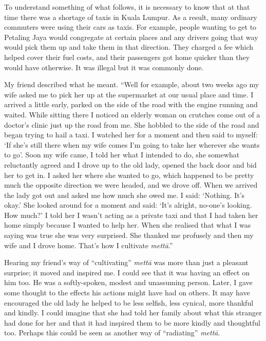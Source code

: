 \documentclass[10pt, openright]{book}
\begin{document}
To understand something of what follows, it is necessary to know that at that time there was a shortage of taxis in Kuala Lumpur. As a result, many ordinary commuters were using their cars as taxis. For example, people wanting to get to Petaling Jaya would congregate at certain places and any drivers going that way would pick them up and take them in that direction. They charged a fee which helped cover their fuel costs, and their passengers got home quicker than they would have otherwise. It was illegal but it was commonly done.


My friend described what he meant. “Well for example, about two weeks ago my wife asked me to pick her up at the supermarket at our usual place and time. I arrived a little early, parked on the side of the road with the engine running and waited. While sitting there I noticed an elderly woman on crutches come out of a doctor’s clinic just up the road from me. She hobbled to the side of the road and began trying to hail a taxi. I watched her for a moment and then said to myself: ‘If she’s still there when my wife comes I’m going to take her wherever she wants to go’. Soon my wife came, I told her what I intended to do, she somewhat reluctantly agreed and I drove up to the old lady, opened the back door and bid her to get in. I asked her where she wanted to go, which happened to be pretty much the opposite direction we were headed, and we drove off. When we arrived the lady got out and asked me how much she owed me. I said: ‘Nothing. It’s okay.’ She looked around for a moment and said: ‘It’s alright, no-one’s looking. How much?’ I told her I wasn’t acting as a private taxi and that I had taken her home simply because I wanted to help her. When she realised that what I was saying was true she was very surprised. She thanked me profusely and then my wife and I drove home. That’s how I cultivate \textit{mettā}.”


Hearing my friend’s way of “cultivating” \textit{mettā} was more than just a pleasant surprise; it moved and inspired me. I could see that it was having an effect on him too. He was a softly-spoken, modest and unassuming person. Later, I gave some thought to the effects his actions might have had on others. It may have encouraged the old lady he helped to be less selfish, less cynical, more thankful and kindly. I could imagine that she had told her family about what this stranger had done for her and that it had inspired them to be more kindly and thoughtful too. Perhaps this could be seen as another way of “radiating” \textit{mettā}.
\end{document}
